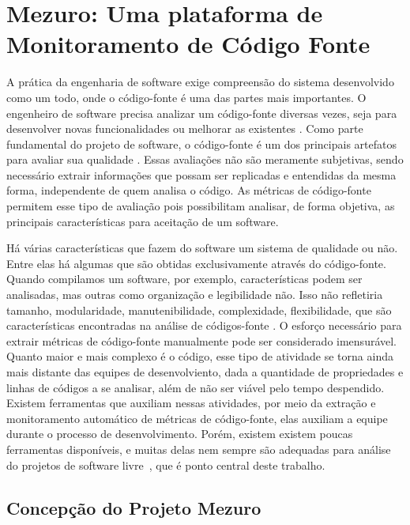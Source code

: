 \chapter{Mezuro: Uma plataforma de Monitoramento de Código Fonte}

A prática da engenharia de software exige compreensão do sistema desenvolvido como um todo, onde o código-fonte é uma das partes mais importantes. O engenheiro de software precisa analizar um código-fonte diversas vezes, seja para desenvolver novas funcionalidades ou melhorar as existentes \cite{meirelles2010mezuro}.
%
Como parte fundamental do projeto de software, o código-fonte é um dos principais artefatos para avaliar sua qualidade \cite{meirelles2009crab}. Essas avaliações não são meramente subjetivas, sendo necessário extrair informações que possam ser replicadas e entendidas da mesma forma, independente de quem analisa o código. As métricas de código-fonte permitem esse tipo de avaliação pois possibilitam analisar, de forma objetiva, as principais características para aceitação de um software.

Há várias características que fazem do software um sistema de qualidade ou não. Entre elas há algumas que são obtidas exclusivamente através do código-fonte. Quando compilamos um software, por exemplo, características podem ser analisadas, mas outras como organização e legibilidade não. Isso não refletiria tamanho, modularidade, manutenibilidade, complexidade, flexibilidade, que são características encontradas na análise de códigos-fonte \cite{meirelles2013metrics}.
%
O esforço necessário para extrair métricas de código-fonte manualmente pode ser considerado imensurável. Quanto maior e mais complexo é o código, esse tipo de atividade se torna ainda mais distante das equipes de desenvolviento, dada a quantidade de propriedades e linhas de códigos a se analisar, além de não ser viável pelo tempo despendido. 
%
Existem ferramentas que auxiliam nessas atividades, por meio da extração e monitoramento automático de métricas de código-fonte, elas auxiliam  a equipe durante o processo de desenvolvimento. Porém, existem existem poucas ferramentas disponíveis, e muitas delas nem sempre são adequadas para análise do projetos de software livre~\cite{meirelles2010mezuro}, que é ponto central deste trabalho.

\section{Concepção do Projeto Mezuro}

